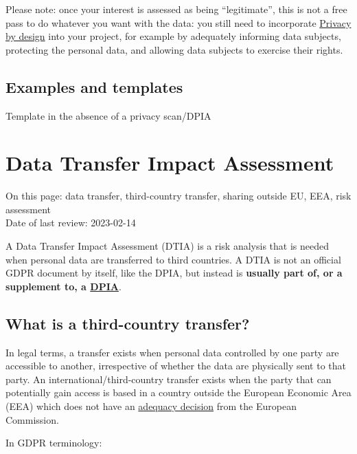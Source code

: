 \documentclass[
]{book}
\begin{document}
Please note: once your interest is assessed as being ``legitimate'', this is not
a free pass to do whatever you want with the data: you still need to incorporate
\protect\hyperlink{privacy-by-design}{Privacy by design} into your project, for example by
adequately informing data subjects, protecting the personal data, and allowing
data subjects to exercise their rights.

\hypertarget{examples-and-templates-3}{%
\subsection{Examples and templates}\label{examples-and-templates-3}}

Template in the absence of a privacy scan/DPIA

\hypertarget{dtia}{%
\section{Data Transfer Impact Assessment}\label{dtia}}

On this page: data transfer, third-country transfer, sharing outside EU, EEA,
risk assessment\\
Date of last review: 2023-02-14

A Data Transfer Impact Assessment (DTIA) is a risk analysis that is needed when
personal data are transferred to third countries. A DTIA is not an official
GDPR document by itself, like the DPIA, but instead is \textbf{usually part of, or a
supplement to, a \protect\hyperlink{dpia}{DPIA}}.

\hypertarget{third-country-transfer}{%
\subsection{What is a third-country transfer?}\label{third-country-transfer}}

In legal terms, a transfer exists when personal data controlled by one party
are accessible to another, irrespective of whether the data are physically sent
to that party. An international/third-country transfer exists when the party
that can potentially gain access is based in a country outside the European
Economic Area (EEA) which does not have an
\href{https://ec.europa.eu/info/law/law-topic/data-protection/international-dimension-data-protection/adequacy-decisions_en}{adequacy decision}
from the European Commission.

In GDPR terminology:
\end{document}
